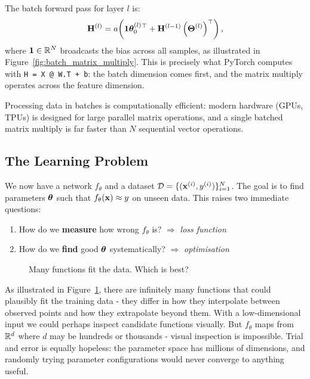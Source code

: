 The batch forward pass for layer $l$ is:
\begin{equation}
\mathbf{H}^{(l)} = a\!\left(\mathbf{1}\boldsymbol{\theta}^{(l)}_0{}^\top + \mathbf{H}^{(l-1)} \left(\boldsymbol{\Theta}^{(l)}\right)^\top\right),
\end{equation}
where $\mathbf{1} \in \mathbb{R}^N$ broadcasts the bias across all samples, as illustrated in Figure~\ref{fig:batch_matrix_multiply}. This is precisely what PyTorch computes with \texttt{H = X @ W.T + b}: the batch dimension comes first, and the matrix multiply operates across the feature dimension.

Processing data in batches is computationally efficient: modern hardware (GPUs, TPUs) is designed for large parallel matrix operations, and a single batched matrix multiply is far faster than $N$ sequential vector operations.

\subsection{The Learning Problem}

We now have a network $f_\theta$ and a dataset $\mathcal{D} = \{(\mathbf{x}^{(i)}, y^{(i)})\}_{i=1}^{N}$. The goal is to find parameters $\boldsymbol{\theta}$ such that $f_\theta(\mathbf{x}) \approx y$ on unseen data. This raises two immediate questions:

\begin{enumerate}
    \item How do we \textbf{measure} how wrong $f_\theta$ is? $\Rightarrow$ \emph{loss function}
    \item How do we \textbf{find} good $\boldsymbol{\theta}$ systematically? $\Rightarrow$ \emph{optimisation}
\end{enumerate}

\begin{figure}
\centering
{}
\resizebox{0.33\textwidth}{!}{}
\caption{Many functions fit the data. Which is best?}
\label{fig:learning_problem}
\end{figure}

As illustrated in Figure~\ref{fig:learning_problem}, there are infinitely many functions that could plausibly fit the training data - they differ in how they interpolate between observed points and how they extrapolate beyond them. With a low-dimensional input we could perhaps inspect candidate functions visually. But $f_\theta$ maps from $\mathbb{R}^d$ where $d$ may be hundreds or thousands - visual inspection is impossible. Trial and error is equally hopeless: the parameter space has millions of dimensions, and randomly trying parameter configurations would never converge to anything useful.

